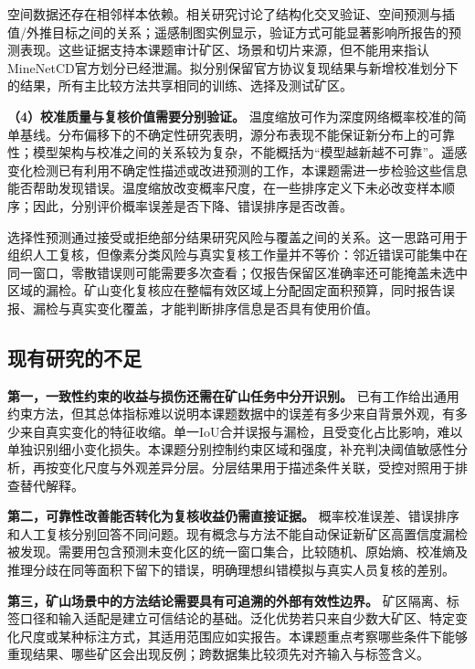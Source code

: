 空间数据还存在相邻样本依赖。相关研究讨论了结构化交叉验证、空间预测与插值/外推目标之间的关系\cite{Roberts2017CV,Valavi2019BlockCV,Mila2022Nearest}；遥感制图实例显示，验证方式可能显著影响所报告的预测表现\cite{Ploton2020Spatial}。这些证据支持本课题审计矿区、场景和切片来源，但不能用来指认MineNetCD官方划分已经泄漏。拟分别保留官方协议复现结果与新增校准划分下的结果，所有主比较方法共享相同的训练、选择及测试矿区。

\textbf{（4）校准质量与复核价值需要分别验证。}
温度缩放可作为深度网络概率校准的简单基线\cite{Guo2017Calibration}。分布偏移下的不确定性研究表明，源分布表现不能保证新分布上的可靠性\cite{Ovadia2019Uncertainty}；模型架构与校准之间的关系较为复杂，不能概括为“模型越新越不可靠”\cite{Minderer2021Calibration}。遥感变化检测已有利用不确定性描述或改进预测的工作\cite{Li2025Uncertainty}，本课题需进一步检验这些信息能否帮助发现错误。温度缩放改变概率尺度，在一些排序定义下未必改变样本顺序；因此，分别评价概率误差是否下降、错误排序是否改善。

选择性预测通过接受或拒绝部分结果研究风险与覆盖之间的关系\cite{Geifman2019SelectiveNet,Gangrade2021Selective,Franc2023Reject}。这一思路可用于组织人工复核，但像素分类风险与真实复核工作量并不等价：邻近错误可能集中在同一窗口，零散错误则可能需要多次查看；仅报告保留区准确率还可能掩盖未选中区域的漏检。矿山变化复核应在整幅有效区域上分配固定面积预算，同时报告误报、漏检与真实变化覆盖，才能判断排序信息是否具有使用价值。

\subsection{现有研究的不足}
\textbf{第一，一致性约束的收益与损伤还需在矿山任务中分开识别。}
已有工作给出通用约束方法，但其总体指标难以说明本课题数据中的误差有多少来自背景外观，有多少来自真实变化的特征收缩。单一IoU合并误报与漏检，且受变化占比影响，难以单独识别细小变化损失。本课题分别控制约束区域和强度，补充判决阈值敏感性分析，再按变化尺度与外观差异分层。分层结果用于描述条件关联，受控对照用于排查替代解释。

\textbf{第二，可靠性改善能否转化为复核收益仍需直接证据。}
概率校准误差、错误排序和人工复核分别回答不同问题。现有概念与方法不能自动保证新矿区高置信度漏检被发现。需要用包含预测未变化区的统一窗口集合，比较随机、原始熵、校准熵及推理分歧在同等面积下留下的错误，明确理想纠错模拟与真实人员复核的差别。

\textbf{第三，矿山场景中的方法结论需要具有可追溯的外部有效性边界。}
矿区隔离、标签口径和输入适配是建立可信结论的基础。泛化优势若只来自少数大矿区、特定变化尺度或某种标注方式，其适用范围应如实报告。本课题重点考察哪些条件下能够重现结果、哪些矿区会出现反例；跨数据集比较须先对齐输入与标签含义。

